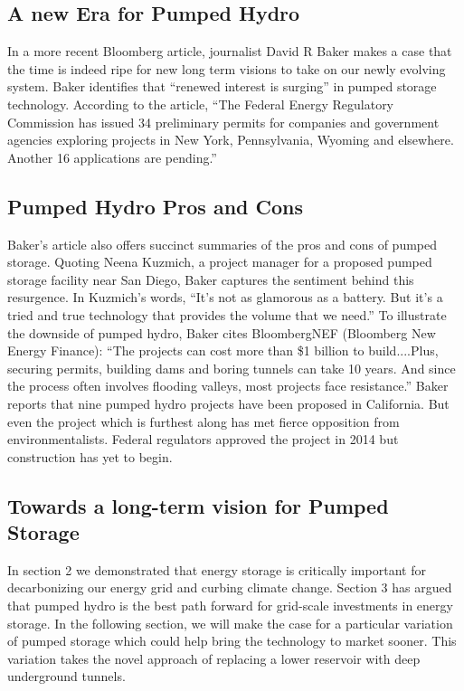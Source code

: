 \documentclass[hidelinks,12pt,a4paper]{article}
\begin{document}
\subsection{A new Era for Pumped Hydro}
In a more recent Bloomberg article, journalist David R Baker makes a case that the time is indeed ripe for new long term visions to take on our newly evolving system. Baker identifies that “renewed interest is surging” in pumped storage technology. \cite{QuestforBiggerBatteries} According to the article, “The Federal Energy Regulatory Commission has issued 34 preliminary permits for companies and government agencies exploring projects in New York, Pennsylvania, Wyoming and elsewhere. Another 16 applications are pending.” \cite{QuestforBiggerBatteries}


\subsection{Pumped Hydro Pros and Cons}
Baker's article also offers succinct summaries of the pros and cons of pumped storage. Quoting Neena Kuzmich, a project manager for a proposed pumped storage facility near San Diego, Baker captures the sentiment behind this resurgence. In Kuzmich's words, “It’s not as glamorous as a battery. But it’s a tried and true technology that provides the volume that we need.” To illustrate the downside of pumped hydro, Baker cites BloombergNEF (Bloomberg New Energy Finance): “The projects can cost more than \$1 billion to build....Plus, securing permits, building dams and boring tunnels can take 10 years. And since the process often involves flooding valleys, most projects face resistance.” Baker reports that nine pumped hydro projects have been proposed in California. But even the project which is furthest along has met fierce opposition from environmentalists. Federal regulators approved the project in 2014 but construction has yet to begin. \cite{QuestforBiggerBatteries}

\subsection{Towards a long-term vision for Pumped Storage}
In section 2 we demonstrated that energy storage is critically important for decarbonizing our energy grid and curbing climate change. Section 3 has argued that pumped hydro is the best path forward for grid-scale investments in energy storage. In the following section, we will make the case for a particular variation of pumped storage which could help bring the technology to market sooner. This variation takes the novel approach of replacing a lower reservoir with deep underground tunnels.
\end{document}
